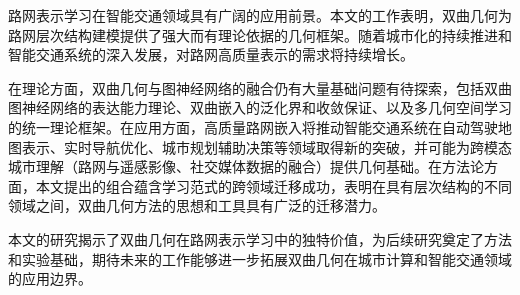 路网表示学习在智能交通领域具有广阔的应用前景。本文的工作表明，双曲几何为路网层次结构建模提供了强大而有理论依据的几何框架。随着城市化的持续推进和智能交通系统的深入发展，对路网高质量表示的需求将持续增长。

在理论方面，双曲几何与图神经网络的融合仍有大量基础问题有待探索，包括双曲图神经网络的表达能力理论、双曲嵌入的泛化界和收敛保证、以及多几何空间学习的统一理论框架。在应用方面，高质量路网嵌入将推动智能交通系统在自动驾驶地图表示、实时导航优化、城市规划辅助决策等领域取得新的突破，并可能为跨模态城市理解（路网与遥感影像、社交媒体数据的融合）提供几何基础。在方法论方面，本文提出的组合蕴含学习范式的跨领域迁移成功，表明在具有层次结构的不同领域之间，双曲几何方法的思想和工具具有广泛的迁移潜力。

本文的研究揭示了双曲几何在路网表示学习中的独特价值，为后续研究奠定了方法和实验基础，期待未来的工作能够进一步拓展双曲几何在城市计算和智能交通领域的应用边界。